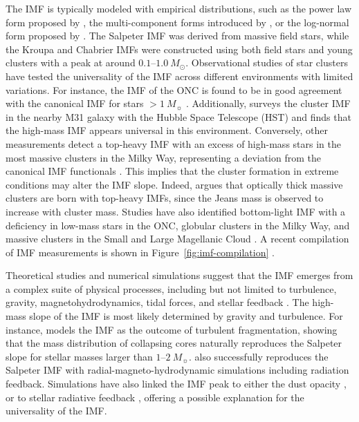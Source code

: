 \documentclass[12pt]{ucsddissertation}
\begin{document}
\begin{CJK*}{UTF8}{gbsn}
The IMF is typically modeled with empirical distributions, such as the power law form proposed by \citet{Salpeter-1955}, the multi-component forms introduced by \citet{Kroupa-2002}, or the log-normal form proposed by \citet{Chabrier-2005}. The Salpeter IMF was derived from massive field stars, while the Kroupa and Chabrier IMFs were constructed using both field stars and young clusters with a peak at around $0.1$--$1.0~M_\odot$. Observational studies of star clusters have tested the universality of the IMF across different environments with limited variations.  For instance, the IMF of the ONC is found to be in good agreement with the canonical IMF for stars $>1~M_\sun$ \citep[e.g.,][]{Hillenbrand-2000, Gennaro-2020}. Additionally, \citet{Weisz-2015} surveys the cluster IMF in the nearby M31 galaxy with the Hubble Space Telescope (HST) and finds that the high-mass IMF appears universal in this environment. Conversely, other measurements detect a top-heavy IMF with an excess of high-mass stars in the most massive clusters in the Milky Way, representing a deviation from the canonical IMF functionals \citep[e.g.,][]{Lu-2013, Schneider-2018, Hosek-2019}. This implies that the cluster formation in extreme conditions may alter the IMF slope. Indeed, \citet{Murray-2009} argues that optically thick massive clusters are born with top-heavy IMFs, since the Jeans mass is observed to increase with cluster mass. Studies have also identified bottom-light IMF with a deficiency in low-mass stars in the ONC, globular clusters in the Milky Way, and massive clusters in the Small and Large Magellanic Cloud \citep[e.g.,][]{DaRio-2012, Baumgardt-2023}. A recent compilation of IMF measurements is shown in Figure~\ref{fig:imf-compilation} \citep[][]{Hennebelle-2024}.

Theoretical studies and numerical simulations suggest that the IMF emerges from a complex suite of physical processes, including but not limited to turbulence, gravity, magnetohydrodynamics, tidal forces, and stellar feedback \citep[][]{Hennebelle-2024}. The high-mass slope of the IMF is most likely determined by gravity and turbulence. For instance, \citet{Padoan-2002} models the IMF as the outcome of turbulent fragmentation, showing that the mass distribution of collapsing cores naturally reproduces the Salpeter slope for stellar masses larger than $1$--$2~M_\sun$. \citet{He-2019} also successfully reproduces the Salpeter IMF with radial-magneto-hydrodynamic simulations including radiation feedback. Simulations have also linked the IMF peak to either the dust opacity \citep[e.g.,][]{Coleman-2020}, or to stellar radiative feedback \citep[e.g.,][]{Krumholz-2016, Cunningham-2018}, offering a possible explanation for the universality of the IMF.



\end{CJK*}
\end{document}
